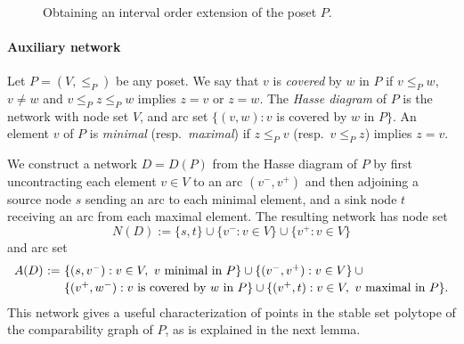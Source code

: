 \documentclass[12pt,oneside]{article}
\begin{document}
\begin{figure}
\begin{center}
\hskip 2.5cm
\\
\hskip 2cm
\end{center}
\caption{\label{fig-weakextension} Obtaining an interval order extension of the poset $P$.}
\end{figure}

\paragraph{Auxiliary network}
Let $P = (V,\leqslant_P)$ be any poset. We say that $v$ is {\em covered\/} by $w$ in $P$ if $v \leqslant_P w$, $v \neq w$ and $v \leqslant_P z \leqslant_P w$ implies $z = v$ or $z = w$. The {\em Hasse diagram\/} of $P$ is the network with node set $V$, and arc set $\{(v,w) : v$ is covered by $w$ in $P\}$. An element $v$ of $P$ is {\em minimal\/} (resp.\ {\em maximal\/}) if $z \leqslant_P v$ (resp.\ $v \leqslant_P z$) implies $z = v$.

We construct a network $D = D(P)$ from the Hasse diagram of $P$ by first uncontracting each element $v \in V$ to an arc $(v^-,v^+)$ and then adjoining a source node $s$ sending an arc to each minimal element, and a sink node $t$ receiving an arc from each maximal element. The resulting network has node set
$$
N(D) := \{s,t\} \cup \{v^- : v \in V\} \cup \{v^+ : v \in V\}
$$
and arc set
$$
\begin{array}{r@{\,\,}c@{\,\,}l}
A(D) &:= &\{(s,v^-) : v \in V,\ v \textrm{ minimal in } P\} \cup \{(v^-,v^+) : v \in V\} \cup \mbox{}\\[.5ex]
&&\{(v^+,w^-) : v \textrm{ is covered by } w \textrm{ in } P\} \cup \{(v^+,t) : v \in V,\ v \textrm{ maximal in } P\}.
\end{array}
$$
This network gives a useful characterization of points in the stable set polytope of the comparability graph of $P$, as is explained in the next lemma.
\end{document}

